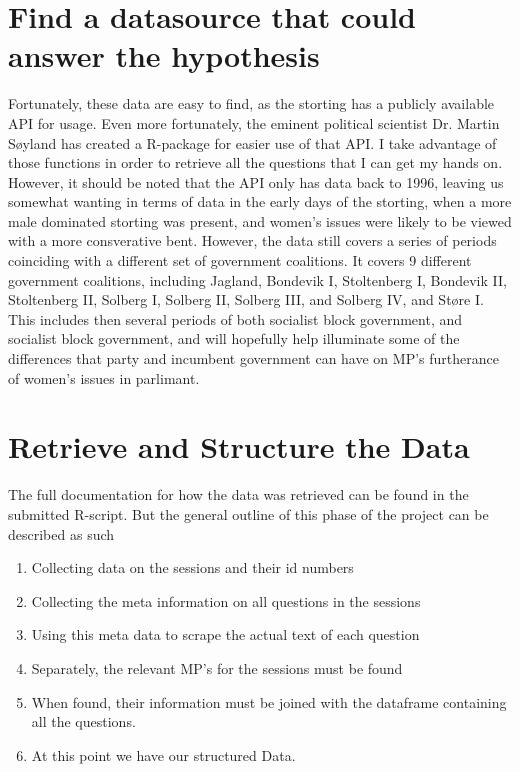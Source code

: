 \documentclass[12pt]{article}
\begin{document}
	\section{Find a datasource that could answer the hypothesis}
	Fortunately, these data are easy to find, as the storting has a publicly available API for usage. Even more fortunately, the eminent political scientist Dr. Martin Søyland has created a R-package for easier use of that API. I take advantage of those functions in order to retrieve all the questions that I can get my hands on. However, it should be noted that the API only has data back to 1996, leaving us somewhat wanting in terms of data in the early days of the storting, when a more male dominated storting was present, and women's issues were likely to be viewed with a more consverative bent. However, the data still covers a series of periods coinciding with a different set of government coalitions. It covers 9 different government coalitions, including Jagland, Bondevik I, Stoltenberg I, Bondevik II, Stoltenberg II, Solberg I, Solberg II, Solberg III, and Solberg IV, and Støre I. This includes then several periods of both socialist block government, and socialist block government, and will hopefully help illuminate some of the differences that party and incumbent government can have on MP's furtherance of women's issues in parlimant.
	
	\section{Retrieve and Structure the Data}
	The full documentation for how the data was retrieved can be found in the submitted R-script. But the general outline of this phase of the project can be described as such
	\begin{enumerate}
		\item Collecting data on the sessions and their id numbers
		\item Collecting the meta information on all questions in the sessions
		\item Using this meta data to scrape the actual text of each question
		\item Separately, the relevant MP's for the sessions must be found
		\item When found, their information must be joined with the dataframe containing all the questions.
		\item At this point we have our structured Data.
	\end{enumerate}
	
\end{document}
